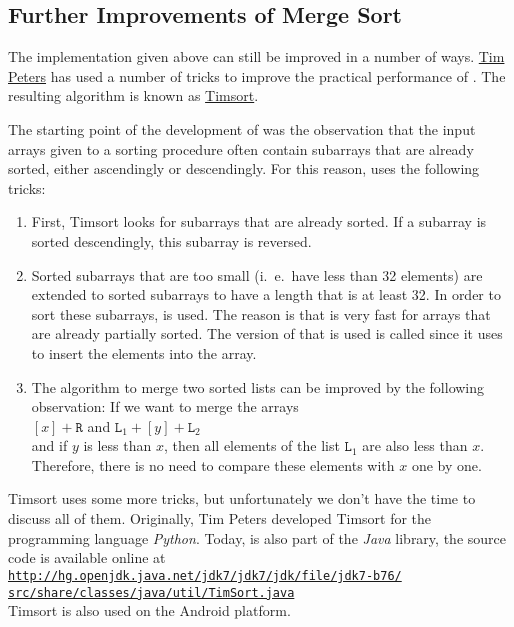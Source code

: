 \subsection{Further Improvements of Merge Sort}
The implementation given above can still be improved in a number of ways.  
\href{http://c2.com/cgi/wiki?TimPeters}{Tim Peters} has used a number of tricks to improve the
practical performance of .  The resulting algorithm is known as
\href{http://en.wikipedia.org/wiki/Timsort}{Timsort}.

The starting point of the development of  was the observation that the input arrays 
given to a sorting procedure often contain subarrays that are already sorted, either ascendingly or
descendingly.   For this reason,  uses the following tricks:
\begin{enumerate}
\item First, Timsort looks for subarrays that are already sorted.
      If a subarray is sorted descendingly, this subarray is reversed.
\item Sorted subarrays that are too small (i.~e.~have less than 32 elements) are extended
      to sorted subarrays to have a length that is at least 32.  In order to sort these subarrays,
       is used.  The reason is that  is very fast for
      arrays that are already partially sorted.  The version of  that is used is called
       since it uses 
      \href{http://en.wikipedia.org/wiki/Binary_search}{} to insert the elements
      into the array.
\item The algorithm to merge two sorted lists can be improved by the following observation: If we
      want to merge the arrays
      \\[0.2cm]
      \hspace*{1.3cm}
      $[x] + \mathtt{R}$ \quad and \quad $\mathtt{L}_1 + [y] + \mathtt{L}_2$
      \\[0.2cm]
      and if $y$ is less than $x$, then all elements of the list $\mathtt{L}_1$ are also less than $x$.
      Therefore, there is no need to compare these elements with $x$ one by one.  
\end{enumerate}
Timsort uses some more tricks, but unfortunately we don't have the time to discuss all of them.
Originally, Tim Peters developed Timsort for the programming language \textsl{Python}.  Today,
 is also part of the \textsl{Java} library, the source code is available online at
\\[0.2cm]
\hspace*{1.3cm}
\href{http://hg.openjdk.java.net/jdk7/jdk7/jdk/file/jdk7-b76/src/share/classes/java/util/TimSort.java}{\texttt{http://hg.openjdk.java.net/jdk7/jdk7/jdk/file/jdk7-b76/\\
\hspace*{2.5cm}
    src/share/classes/java/util/TimSort.java}}
\\[0.2cm]
Timsort is also used on the Android platform.

